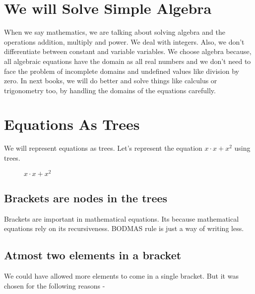 \documentclass{book}
\begin{document}
\section{We will Solve Simple Algebra}
When we say mathematics, we are talking about solving algebra and the operations addition, multiply and power. We deal with integers. Also, we don't differentiate between constant and variable variables. We choose algebra because, all algebraic equations have the domain as all real numbers and we don't need to face the problem of incomplete domains and undefined values like division by zero. In next books, we will do better and solve things like calculus or trigonometry too, by handling the domains of the equations carefully.

\section{Equations As Trees}
We will represent equations as trees. Let's represent the equation \(x \cdot x + x^2\) using trees.
\begin{figure}[h]
    \centering
    \caption{\(x \cdot x + x^2\)}
    \label{fig:tikz1}
\end{figure}

\subsection{Brackets are nodes in the trees}
Brackets are important in mathematical equations. Its because mathematical equations rely on its recursiveness. BODMAS rule is just a way of writing less.

\subsection{Atmost two elements in a bracket}
We could have allowed more elements to come in a single bracket. But it was chosen for the following reasons -
\end{document}
